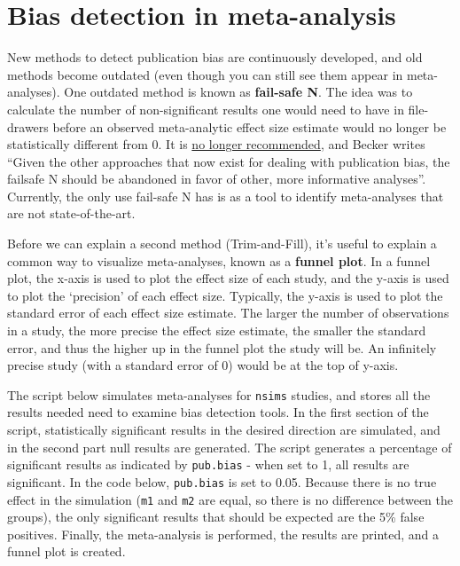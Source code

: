 \documentclass[
  oneside]{book}
\begin{document}
\hypertarget{bias-detection-in-meta-analysis}{%
\section{Bias detection in meta-analysis}\label{bias-detection-in-meta-analysis}}

New methods to detect publication bias are continuously developed, and old methods become outdated (even though you can still see them appear in meta-analyses). One outdated method is known as \textbf{fail-safe N}. The idea was to calculate the number of non-significant results one would need to have in file-drawers before an observed meta-analytic effect size estimate would no longer be statistically different from 0. It is \href{https://handbook-5-1.cochrane.org/chapter_10/10_4_4_3_fail_safe_n.htm}{no longer recommended}, and Becker \citeyearpar{becker_failsafe_2005} writes ``Given the other approaches that now exist for dealing with publication bias, the failsafe N should be abandoned in favor of other, more informative analyses''. Currently, the only use fail-safe N has is as a tool to identify meta-analyses that are not state-of-the-art.

Before we can explain a second method (Trim-and-Fill), it's useful to explain a common way to visualize meta-analyses, known as a \textbf{funnel plot}. In a funnel plot, the x-axis is used to plot the effect size of each study, and the y-axis is used to plot the `precision' of each effect size. Typically, the y-axis is used to plot the standard error of each effect size estimate. The larger the number of observations in a study, the more precise the effect size estimate, the smaller the standard error, and thus the higher up in the funnel plot the study will be. An infinitely precise study (with a standard error of 0) would be at the top of y-axis.

The script below simulates meta-analyses for \texttt{nsims} studies, and stores all the results needed need to examine bias detection tools. In the first section of the script, statistically significant results in the desired direction are simulated, and in the second part null results are generated. The script generates a percentage of significant results as indicated by \texttt{pub.bias} - when set to 1, all results are significant. In the code below, \texttt{pub.bias} is set to 0.05. Because there is no true effect in the simulation (\texttt{m1} and \texttt{m2} are equal, so there is no difference between the groups), the only significant results that should be expected are the 5\% false positives. Finally, the meta-analysis is performed, the results are printed, and a funnel plot is created.
\end{document}
